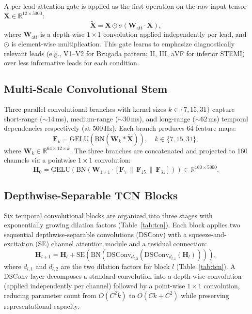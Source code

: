 \documentclass[journal]{IEEEtran}
\begin{document}
A per-lead attention gate is applied as the first operation on the
raw input tensor $\mathbf{X} \in \mathbb{R}^{12 \times 5000}$:
\begin{equation}
  \tilde{\mathbf{X}} = \mathbf{X} \odot
  \sigma\!\left(\mathbf{W}_{\text{att}} \cdot \mathbf{X}\right),
\end{equation}
where $\mathbf{W}_{\text{att}}$ is a depth-wise $1{\times}1$
convolution applied independently per lead, and $\odot$ is
element-wise multiplication.
This gate learns to emphasize diagnostically relevant leads
(e.g., V1–V2 for Brugada pattern; II, III, aVF for inferior
STEMI) over less informative leads for each condition.

\subsection{Multi-Scale Convolutional Stem}

Three parallel convolutional branches with kernel sizes $k \in \{7, 15, 31\}$
capture short-range (${\sim}14$\,ms), medium-range (${\sim}30$\,ms),
and long-range (${\sim}62$\,ms) temporal dependencies respectively
(at 500\,Hz).
Each branch produces 64 feature maps:
\begin{equation}
  \mathbf{F}_k = \text{GELU}\!\left(\text{BN}\!\left(
  \mathbf{W}_k * \tilde{\mathbf{X}}\right)\right),
  \quad k \in \{7, 15, 31\},
\end{equation}
where $\mathbf{W}_k \in \mathbb{R}^{64 \times 12 \times k}$.
The three branches are concatenated and projected to 160 channels
via a pointwise $1{\times}1$ convolution:
\begin{equation}
  \mathbf{H}_0 = \text{GELU}\!\left(\text{BN}\!\left(
  \mathbf{W}_{1\times1} \cdot
  [\mathbf{F}_7 \,\|\, \mathbf{F}_{15} \,\|\, \mathbf{F}_{31}]
  \right)\right) \in \mathbb{R}^{160 \times 5000}.
\end{equation}

\subsection{Depthwise-Separable TCN Blocks}

Six temporal convolutional blocks are organized into three stages
with exponentially growing dilation factors (Table~\ref{tab:tcn}).
Each block applies two sequential depthwise-separable convolutions
(DSConv) with a squeeze-and-excitation (SE) channel attention module
\cite{hu2018squeeze} and a residual connection:
\begin{equation}
  \mathbf{H}_{l+1} = \mathbf{H}_l + \text{SE}\!\left(
  \text{BN}\!\left(\text{DSConv}_{d_{l,2}}\!\left(
  \text{DSConv}_{d_{l,1}}\!\left(\mathbf{H}_l\right)
  \right)\right)\right),
\end{equation}
where $d_{l,1}$ and $d_{l,2}$ are the two dilation factors for
block $l$ (Table~\ref{tab:tcn}).
A DSConv layer decomposes a standard convolution into a
depth-wise convolution (applied independently per channel) followed
by a point-wise $1{\times}1$ convolution, reducing parameter count
from $O(C^2 k)$ to $O(Ck + C^2)$ while preserving representational
capacity.
\end{document}
